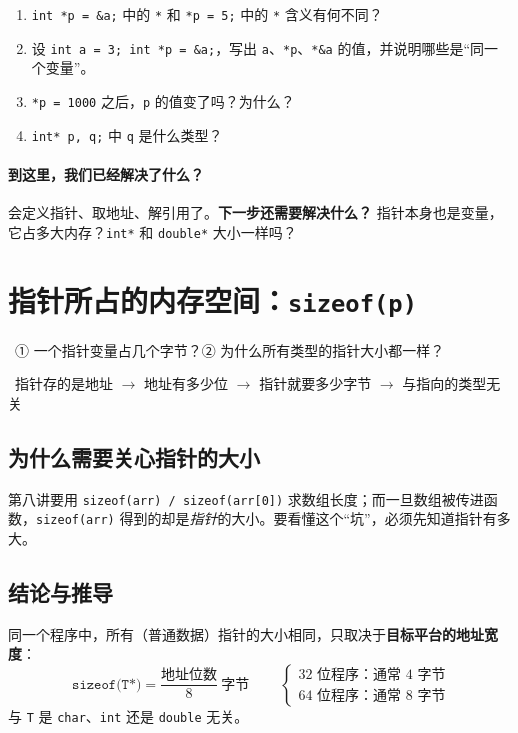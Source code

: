 \documentclass[UTF8,a4paper,11pt,fontset=none,zihao=-4]{ctexart}
\newcommand{\ci}[1]{{\circfont #1}}
\newcommand{\cpp}[1]{\lstinline[style=cpp,basicstyle=\ttfamily,numbers=none]{#1}}
\newcommand{\cc}[1]{\texttt{#1}}
\begin{document}
\begin{checkbox}
\begin{enumerate}[label=\arabic*.,itemsep=0pt]
  \item \cc{int *p = \&a;} 中的 \cc{*} 和 \cc{*p = 5;} 中的 \cc{*} 含义有何不同？
  \item 设 \cc{int a = 3; int *p = \&a;}，写出 \cc{a}、\cc{*p}、\cc{*\&a} 的值，并说明哪些是“同一个变量”。
  \item \cc{*p = 1000} 之后，\cc{p} 的值变了吗？为什么？
  \item \cc{int* p, q;} 中 \cc{q} 是什么类型？
\end{enumerate}
\end{checkbox}

\paragraph{到这里，我们已经解决了什么？} 会定义指针、取地址、解引用了。\textbf{下一步还需要解决什么？} 指针本身也是变量，它占多大内存？\cc{int*} 和 \cc{double*} 大小一样吗？

\section{\texorpdfstring{指针所占的内存空间：\texttt{sizeof(p)}}{指针所占的内存空间：sizeof(p)}}\label{sec:size}
\ \ci{①} 一个指针变量占几个字节？\ci{②} 为什么所有类型的指针大小都一样？\par
{}\ 指针存的是地址 $\to$ 地址有多少位 $\to$ 指针就要多少字节 $\to$ 与指向的类型无关

\subsection{为什么需要关心指针的大小}
第八讲要用 \cpp{sizeof(arr) / sizeof(arr[0])} 求数组长度；而一旦数组被传进函数，\cpp{sizeof(arr)} 得到的却是\emph{指针}的大小。要看懂这个“坑”，必须先知道指针有多大。

\subsection{结论与推导}
\begin{theorembox}[指针的大小]
同一个程序中，所有（普通数据）指针的大小相同，只取决于\textbf{目标平台的地址宽度}：
\[
\boxed{\ \texttt{sizeof(T*)} = \frac{\text{地址位数}}{8}\ \text{字节}\ }\qquad
\begin{cases}\text{32 位程序：通常 4 字节}\\ \text{64 位程序：通常 8 字节}\end{cases}
\]
与 \cc{T} 是 \cc{char}、\cc{int} 还是 \cc{double} 无关。
\end{theorembox}
\end{document}

